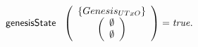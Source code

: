 \begin{definition}
$$
    \mathsf{genesisState}~\mathit{~}\left(
      \begin{array}{c}
        \left\{
        Genesis_{UTxO}
        \right\} \\
        \left(
        \begin{array}{c}
          \emptyset\\
          \emptyset
        \end{array}
        \right)
      \end{array}
    \right) = \mathit{true}.
$$
\end{definition}


